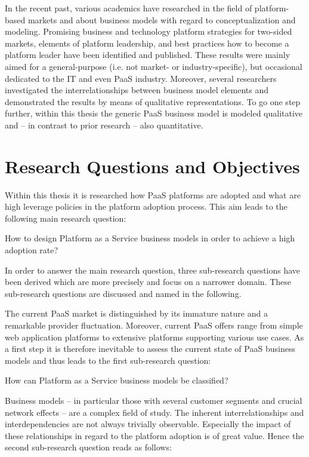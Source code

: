 In the recent past, various academics have researched in the field of platform-based markets and about business models with regard to conceptualization and modeling. Promising business and technology platform strategies for two-sided markets, elements of platform leadership, and best practices how to become a platform leader have been identified and published. These results were mainly aimed for a general-purpose (i.e. not market- or industry-specific), but occasional dedicated to the \ac{IT} and even \ac{PaaS} industry. Moreover, several researchers investigated the interrelationships between business model elements and demonstrated the results by means of qualitative representations. To go one step further, within this thesis the generic \ac{PaaS} business model is modeled qualitative and -- in contrast to prior research -- also quantitative.

\section{Research Questions and Objectives}\label{ch:intro:rq}

Within this thesis it is researched how \ac{PaaS} platforms are adopted and what are high leverage policies in the platform adoption process. This aim leads to the following main research question:

\begin{MRQ}\label{mrq}
How to design Platform as a Service business models in order to achieve a high adoption rate?
\end{MRQ}

In order to answer the main research question, three sub-research questions have been derived which are more precisely and focus on a narrower domain. These sub-research questions are discussed and named in the following.

The current \ac{PaaS} market is distinguished by its immature nature and a remarkable provider fluctuation. Moreover, current \ac{PaaS} offers range from simple web application platforms to extensive platforms supporting various use cases. As a first step it is therefore inevitable to assess the current state of \ac{PaaS} business models and thus leads to the first sub-research question:

\begin{SRQ}\label{srq1}
How can Platform as a Service business models be classified?
\end{SRQ}

Business models -- in particular those with several customer segments and crucial network effects -- are a complex field of study. The inherent interrelationships and interdependencies are not always trivially observable. Especially the impact of these relationships in regard to the platform adoption is of great value. Hence the second sub-research question reads as follows:

